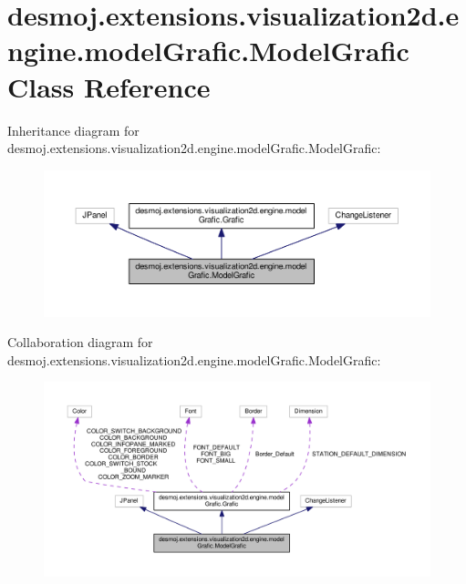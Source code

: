 \section{desmoj.\-extensions.\-visualization2d.\-engine.\-model\-Grafic.\-Model\-Grafic Class Reference}
\label{classdesmoj_1_1extensions_1_1visualization2d_1_1engine_1_1model_grafic_1_1_model_grafic}


Inheritance diagram for desmoj.\-extensions.\-visualization2d.\-engine.\-model\-Grafic.\-Model\-Grafic\-:
\nopagebreak
\begin{figure}[H]
\begin{center}
\leavevmode
\includegraphics[width=350pt]{classdesmoj_1_1extensions_1_1visualization2d_1_1engine_1_1model_grafic_1_1_model_grafic__inherit__graph}
\end{center}
\end{figure}


Collaboration diagram for desmoj.\-extensions.\-visualization2d.\-engine.\-model\-Grafic.\-Model\-Grafic\-:
\nopagebreak
\begin{figure}[H]
\begin{center}
\leavevmode
\includegraphics[width=350pt]{classdesmoj_1_1extensions_1_1visualization2d_1_1engine_1_1model_grafic_1_1_model_grafic__coll__graph}
\end{center}
\end{figure}
